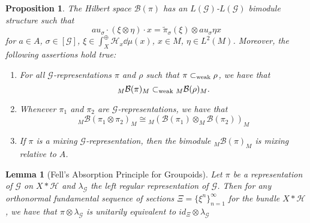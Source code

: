 \documentclass[a4paper,11pt]{article}
\numberwithin{equation}{section}
\newtheorem{lem}[thm]{Lemma}
\newtheorem{prop}[thm]{Proposition}
\theoremstyle{definition}
\theoremstyle{remark}
\numberwithin{equation}{section}
\newcommand{\rG}{\mathcal{G}}
\newcommand{\B}{\mathcal{B}}
\def\H{\mathcal H}
\newcommand{\subwk}{\subset_{\rm{weak}}}
\numberwithin{equation}{section}
\begin{document}
\begin{prop}\label{reptobim}
    The Hilbert space $ \B(\pi) $ has an $ L(\rG) $-$ L(\rG) $ bimodule structure such that 
    \[
        au_{\sigma}\cdot (\xi \otimes \eta) \cdot x = \widetilde{\pi}_{\sigma}(\xi)\otimes au_{\sigma}\eta x
    \]
    for $ a\in A $, $ \sigma\in [\rG] $, $ \xi\in \int_{X}^{\oplus}\H_{x} \dd{\mu(x)} $, $ x\in M $, $ \eta\in L^{2}(M) $.
    Moreover, the following assertions hold true:
    \begin{enumerate}[noitemsep]
        \item For all $ \rG $-representations $\pi$ and $\rho$ such that $ \pi \subwk \rho $, we have that
            \[
                _M\B(\pi)_M \subwk {}_M\B(\rho)_M.
            \]
        \item Whenever $ \pi_{1} $ and $ \pi_{2} $ are $ \rG $-representations, we have that
            \[
                _M\B(\pi_{1}\otimes \pi_{2})_M \cong {}_M(\B(\pi_{1})\otimes_M \B(\pi_{2}))_M
            \]
        \item If $ \pi $ is a mixing $ \rG $-representation, then the bimodule $ {}_M \B(\pi)_M $ is mixing relative to $ A $.
    \end{enumerate}

\end{prop}


\begin{lem}[Fell's Absorption Principle for Groupoids]
  Let $ \pi $ be a representation of $ \rG $ on $ X\ast \H $ and $ \lambda_\rG $ the left regular representation of $ \rG $. Then for any orthonormal fundamental sequence of sections $ \Xi=\{\xi^n\}_{n=1}^\infty $ for the bundle $ X\ast \H $, we have that $ \pi\otimes \lambda_\rG $ is unitarily equivalent to $ id_{\Xi}\otimes \lambda_\rG $
\end{lem}
\end{document}

